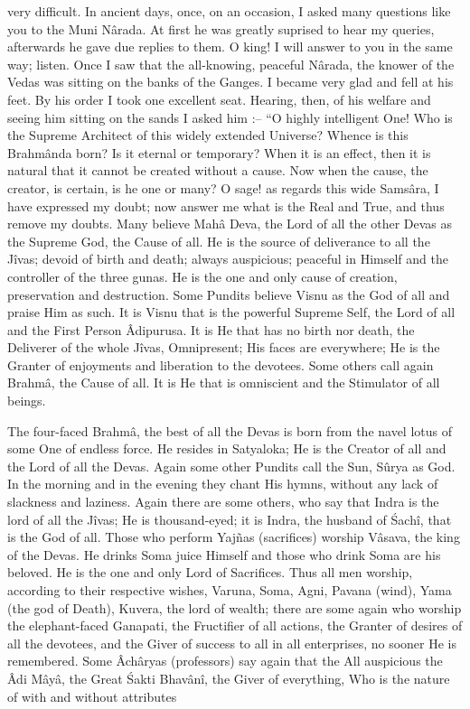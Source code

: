 very difficult. In ancient days, once, on an occasion, I asked many questions like you to the Muni N\^arada. At first he was greatly suprised to hear my queries, afterwards he gave due replies to them. O king! I will answer to you in the same way; listen. Once I saw that the all-knowing, peaceful N\^arada, the knower of the Vedas was sitting on the banks of the Ganges. I became very glad and fell at his feet. By his order I took one excellent seat. Hearing, then, of his welfare and seeing him sitting on the sands I asked him :-- ``O highly intelligent One! Who is the Supreme Architect of this widely extended Universe? Whence is this Brahm\^anda born? Is it eternal or temporary? When it is an effect, then it is natural that it cannot be created without a cause. Now when the cause, the creator, is certain, is he one or many? O sage! as regards this wide Sams\^ara, I have expressed my doubt; now answer me what is the Real and True, and thus remove my doubts. Many believe Mah\^a Deva, the Lord of all the other Devas as the Supreme God, the Cause of all. He is the source of deliverance to all the J\^ivas; devoid of birth and death; always auspicious; peaceful in Himself and the controller of the three gunas. He is the one and only cause of creation, preservation and destruction. Some Pundits believe Visnu as the God of all and praise Him as such. It is Visnu that is the powerful Supreme Self, the Lord of all and the First Person Âdipurusa. It is He that has no birth nor death, the Deliverer of the whole J\^ivas, Omnipresent; His faces are everywhere; He is the Granter of enjoyments and liberation to the devotees. Some others call again Brahm\^a, the Cause of all. It is He that is omniscient and the Stimulator of all beings.

The four-faced Brahm\^a, the best of all the Devas is born from the navel lotus of some One of endless force. He resides in Satyaloka; He is the Creator of all and the Lord of all the Devas. Again some other Pundits call the Sun, Sûrya as God. In the morning and in the evening they chant His hymns, without any lack of slackness and laziness. Again there are some others, who say that Indra is the lord of all the J\^ivas; He is thousand-eyed; it is Indra, the husband of \'Sach\^i, that is the God of all. Those who perform Yaj\~nas (sacrifices) worship V\^asava, the king of the Devas. He drinks Soma juice Himself and those who drink Soma are his beloved. He is the one and only Lord of Sacrifices. Thus all men worship, according to their respective wishes, Varuna, Soma, Agni, Pavana (wind), Yama (the god of Death), Kuvera, the lord of wealth; there are some again who worship the elephant-faced Ganapati, the Fructifier of all actions, the Granter of desires of all the devotees, and the Giver of success to all in all enterprises, no sooner He is remembered. Some Âch\^aryas (professors) say again that the All auspicious the Âdi M\^ay\^a, the Great \'Sakti Bhav\^an\^i, the Giver of everything, Who is the nature of with and without attributes

